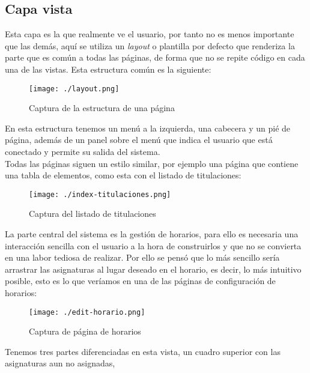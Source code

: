 \subsection{Capa vista}

Esta capa es la que realmente ve el usuario, por tanto no es menos importante que las demás, aquí se utiliza un {\em layout} o plantilla por defecto que renderiza la parte que es común a todas las páginas, de forma que no se repite código en cada una de las vistas. Esta estructura común es la siguiente:

\begin{figure}[H] 
  \label{captura-layout} 
	\begin{center}
    \texttt{[image: ./layout.png]}
  \end{center}
\caption{Captura de la estructura de una página}
\end{figure}

En esta estructura tenemos un menú a la izquierda, una cabecera y un pié de página, además de un panel sobre el menú que indica el usuario que está conectado y permite su salida del sistema.\\

Todas las páginas siguen un estilo similar, por ejemplo una página que contiene una tabla de elementos, como esta con el listado de titulaciones:

\begin{figure}[H] 
  \label{captura-index-titulaciones} 
	\begin{center}
    \texttt{[image: ./index-titulaciones.png]}
  \end{center}
\caption{Captura del listado de titulaciones}
\end{figure}

La parte central del sistema es la gestión de horarios, para ello es necesaria una interacción sencilla con el usuario a la hora de construirlos y que no se convierta en una labor tediosa de realizar. Por ello se pensó que lo más sencillo sería arrastrar las asignaturas al lugar deseado en el horario, es decir, lo más intuitivo posible, esto es lo que veríamos en una de las páginas de configuración de horarios:

\begin{figure}[H] 
  \label{captura-horarios} 
	\begin{center}
    \texttt{[image: ./edit-horario.png]}
  \end{center}
\caption{Captura de página de horarios}
\end{figure}

Tenemos tres partes diferenciadas en esta vista, un cuadro superior con las asignaturas aun no asignadas, 

